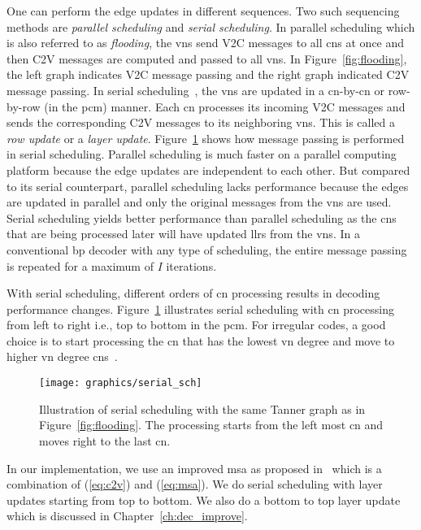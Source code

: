 One can perform the edge updates in different sequences. Two such sequencing methods are \emph{parallel scheduling} and \emph{serial scheduling}. In parallel scheduling which is also referred to as \emph{flooding}, the \glspl{vn} send V2C messages to all \glspl{cn} at once and then C2V messages are computed and passed to all \glspl{vn}. In Figure~\ref{fig:flooding}, the left graph indicates V2C message passing and the right graph indicated C2V message passing. In serial scheduling~\cite{Zhang2002}, the \glspl{vn} are updated in a \gls{cn}-by-\gls{cn} or row-by-row (in the \gls{pcm}) manner. Each \gls{cn} processes its incoming V2C messages and sends the corresponding C2V messages to its neighboring \glspl{vn}. This is called a \emph{row update} or a \emph{layer update}. Figure~\ref{fig:serial_sch} shows how message passing is performed in serial scheduling. Parallel scheduling is much faster on a parallel computing platform because the edge updates are independent to each other. But compared to its serial counterpart, parallel scheduling lacks performance because the edges are updated in parallel and only the original messages from the \glspl{vn} are used. Serial scheduling yields better performance than parallel scheduling as the \glspl{cn} that are being processed later will have updated \glspl{llr} from the \glspl{vn}. In a conventional \gls{bp} decoder with any type of scheduling, the entire message passing is repeated for a maximum of $I$ iterations.

With serial scheduling, different orders of \gls{cn} processing results in decoding performance changes. Figure~\ref{fig:serial_sch} illustrates serial scheduling with \gls{cn} processing from left to right i.e., top to bottom in the \gls{pcm}. For irregular codes, a good choice is to start processing the \gls{cn} that has the lowest \gls{vn} degree and move to higher \gls{vn} degree \glspl{cn}~\cite{Fren1902:Static}.

\begin{figure}[htbp]
  \centering
  \texttt{[image: graphics/serial\_sch]}
  \caption{Illustration of serial scheduling with the same Tanner graph as in Figure~\ref{fig:flooding}. The processing starts from the left most \gls{cn} and moves right to the last \gls{cn}.}
  \label{fig:serial_sch}
\end{figure}

In our implementation, we use an improved \gls{msa} as proposed in~\cite{Jones2003} which is a combination of (\ref{eq:c2v}) and (\ref{eq:msa}). We do serial scheduling with layer updates starting from top to bottom. We also do a bottom to top layer update which is discussed in Chapter~\ref{ch:dec_improve}.

